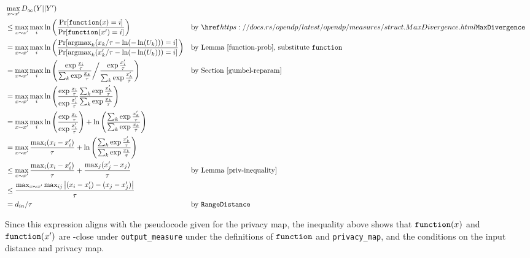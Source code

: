 \documentclass{article}
\begin{document}
\begin{align*} 
    &\max_{x \sim x'} D_\infty(Y || Y') \\
    &\leq \max_{x \sim x'} \max_i \ln\left(\frac{\Pr[\function(x) = i]}{\Pr[\function(x') = i]}\right)  
    &&\text{by } \rustdoc{measures/struct}{MaxDivergence}\\ 
    &= \max_{x \sim x'} \max_i \ln\left(\frac 
            {\Pr[\mathrm{argmax}_k (x_k / \tau - \ln(-\ln(U_k))) = i]} 
            {\Pr[\mathrm{argmax}_k (x'_k / \tau - \ln(-\ln(U_k))) = i]} 
        \right) &&\text{by Lemma~\ref{function-prob}, substitute \function}\\ 
    &= \max_{x \sim x'} \max_i \ln \left( 
        \frac 
            {\exp \frac{x_i}{\tau}} 
            {\sum_{k} \exp\frac{x_k}{\tau} 
        } 
        \bigg/ \frac 
            {\exp\frac{x'_i}{\tau}} 
            {\sum_{k} \exp\frac{x'_k}{\tau}} \right) 
        &&\text{by Section~\ref{gumbel-reparam}} \\ 
    &= \max_{x \sim x'} \max_i \ln \left(\frac 
        {\exp\frac{x_i}{\tau}}{\exp\frac{x'_i}{\tau}} 
        \frac{\sum_{k} \exp\frac{x'_k}{\tau}}{\sum_{k} \exp\frac{x_k}{\tau}}\right) \\ 
    &= \max_{x \sim x'} \max_i \ln \left(\frac 
        {\exp\frac{x_i}{\tau}}{\exp\frac{x'_i}{\tau}}\right) + \ln \left( 
        \frac{\sum_{k} \exp\frac{x'_k}{\tau}}{\sum_{k} \exp\frac{x_k}{\tau}}\right) \\ 
    &= \max_{x \sim x'} \frac{\max_i (x_i - x'_i)}{\tau}  
        + \ln\left(\frac{\sum_{k} \exp\frac{x'_k}{\tau}}{\sum_{k} \exp\frac{x_k}{\tau}}\right) \\ 
    &\leq \max_{x \sim x'} \frac{\max_i (x_i - x'_i)}{\tau} + \frac{\max_j (x'_j - x_j)}{\tau} &&\text{by Lemma~\ref{priv-inequality}} \\ 
    &\leq \frac{\max_{x \sim x'} \max_{ij} \abs{(x_i - x'_i) - (x_j - x'_j)}}{\tau} \\ 
    &= d_{in} / \tau &&\text{by }\texttt{RangeDistance}\\ 
\end{align*} 
 
Since this expression aligns with the pseudocode given for the privacy map, 
the inequality above shows that $\texttt{function}(x)$ and $\texttt{function}(x')$ are \dout-close under \texttt{output\_measure}  
under the definitions of $\texttt{function}$ and \texttt{privacy\_map},  
and the conditions on the input distance and privacy map. 
 
 
 
 
 
 
\end{document}
